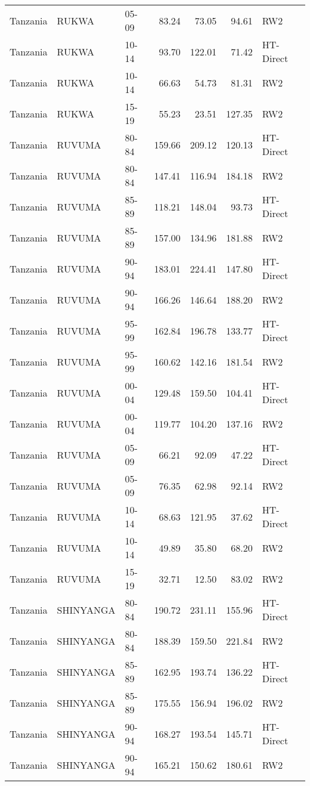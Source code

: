 \begin{longtable}{lllrrrl}
  Tanzania & RUKWA & 05-09 & 83.24 & 73.05 & 94.61 & RW2 \\ 
  Tanzania & RUKWA & 10-14 & 93.70 & 122.01 & 71.42 & HT-Direct \\ 
  Tanzania & RUKWA & 10-14 & 66.63 & 54.73 & 81.31 & RW2 \\ 
  Tanzania & RUKWA & 15-19 & 55.23 & 23.51 & 127.35 & RW2 \\ 
  Tanzania & RUVUMA & 80-84 & 159.66 & 209.12 & 120.13 & HT-Direct \\ 
  Tanzania & RUVUMA & 80-84 & 147.41 & 116.94 & 184.18 & RW2 \\ 
  Tanzania & RUVUMA & 85-89 & 118.21 & 148.04 & 93.73 & HT-Direct \\ 
  Tanzania & RUVUMA & 85-89 & 157.00 & 134.96 & 181.88 & RW2 \\ 
  Tanzania & RUVUMA & 90-94 & 183.01 & 224.41 & 147.80 & HT-Direct \\ 
  Tanzania & RUVUMA & 90-94 & 166.26 & 146.64 & 188.20 & RW2 \\ 
  Tanzania & RUVUMA & 95-99 & 162.84 & 196.78 & 133.77 & HT-Direct \\ 
  Tanzania & RUVUMA & 95-99 & 160.62 & 142.16 & 181.54 & RW2 \\ 
  Tanzania & RUVUMA & 00-04 & 129.48 & 159.50 & 104.41 & HT-Direct \\ 
  Tanzania & RUVUMA & 00-04 & 119.77 & 104.20 & 137.16 & RW2 \\ 
  Tanzania & RUVUMA & 05-09 & 66.21 & 92.09 & 47.22 & HT-Direct \\ 
  Tanzania & RUVUMA & 05-09 & 76.35 & 62.98 & 92.14 & RW2 \\ 
  Tanzania & RUVUMA & 10-14 & 68.63 & 121.95 & 37.62 & HT-Direct \\ 
  Tanzania & RUVUMA & 10-14 & 49.89 & 35.80 & 68.20 & RW2 \\ 
  Tanzania & RUVUMA & 15-19 & 32.71 & 12.50 & 83.02 & RW2 \\ 
  Tanzania & SHINYANGA & 80-84 & 190.72 & 231.11 & 155.96 & HT-Direct \\ 
  Tanzania & SHINYANGA & 80-84 & 188.39 & 159.50 & 221.84 & RW2 \\ 
  Tanzania & SHINYANGA & 85-89 & 162.95 & 193.74 & 136.22 & HT-Direct \\ 
  Tanzania & SHINYANGA & 85-89 & 175.55 & 156.94 & 196.02 & RW2 \\ 
  Tanzania & SHINYANGA & 90-94 & 168.27 & 193.54 & 145.71 & HT-Direct \\ 
  Tanzania & SHINYANGA & 90-94 & 165.21 & 150.62 & 180.61 & RW2 \\ 

\end{longtable}
